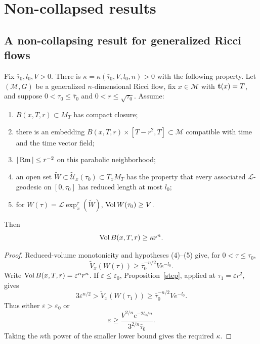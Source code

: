 \chapter{Non-collapsed results}
\label{chap:noncollapsed}
\label{noncoll}

\section{A non-collapsing result for generalized Ricci flows}

\begin{theorem}
\label{thm:kappa-noncollapsed-generalized-flow}
\label{THM}

Fix $\bar\tau_0,l_0,V>0$. There is
$\kappa=\kappa(\bar\tau_0,V,l_0,n)>0$ with the following property.
Let $({\mathcal M},G)$ be a generalized $n$-dimensional Ricci flow, fix
$x\in{\mathcal M}$ with ${\bf t}(x)=T$, and suppose
$0<\tau_0\leq\bar\tau_0$ and $0<r\leq\sqrt{\tau_0}$. Assume:
\begin{enumerate}
\item[(1)] $B(x,T,r)\subset M_T$ has compact closure;
\item[(2)] there is an embedding
$B(x,T,r)\times[T-r^2,T]\subset{\mathcal M}$ compatible with time and the
time vector field;
\item[(3)] $|\operatorname{Rm}|\leq r^{-2}$ on this parabolic neighborhood;
\item[(4)] an open set
$\widetilde W\subset\widetilde{\mathcal U}_x(\tau_0)\subset T_xM_T$ has the
property that every associated $\mathcal L$-geodesic on $[0,\tau_0]$ has
reduced length at most $l_0$;
\item[(5)] for
$W(\tau)={\mathcal L}\operatorname{exp}_x^\tau(\widetilde W)$,
$\operatorname{Vol} W(\tau_0)\geq V$.
\end{enumerate}
Then
\[
  \operatorname{Vol} B(x,T,r)\geq\kappa r^n.
\]
\end{theorem}

\begin{proof}
\sketch

Reduced-volume monotonicity and hypotheses (4)--(5) give, for
$0<\tau\leq\tau_0$,
\begin{equation}
\label{redvoleqn}
  \widetilde V_x(W(\tau))
  \geq\bar\tau_0^{-n/2}Ve^{-l_0}.
\end{equation}
Write
$\operatorname{Vol} B(x,T,r)=\varepsilon^nr^n$. If
$\varepsilon\leq\varepsilon_0$, Proposition~\ref{step}, applied at
$\tau_1=\varepsilon r^2$, gives
\[
  3\varepsilon^{n/2}>
  \widetilde V_x(W(\tau_1))
  \geq\bar\tau_0^{-n/2}Ve^{-l_0}.
\]
Thus either $\varepsilon>\varepsilon_0$ or
\[
  \varepsilon\geq
  \frac{V^{2/n}e^{-2l_0/n}}{3^{2/n}\bar\tau_0}.
\]
Taking the $n$th power of the smaller lower bound gives the required
$\kappa$.
\end{proof}

